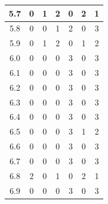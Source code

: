 \documentclass[11pt]{jreport}
\begin{document}
\begin{table}
{\begin{tabular}{c|c|c|c|c|c|c}
    \hline
    5.7 & 0 & 1 & 2 & 0 & 2 & 1 \\
    \hline
    5.8 & 0 & 0 & 1 & 2 & 0 & 3 \\
    \hline
    5.9 & 0 & 1 & 2 & 0 & 1 & 2 \\
    \hline
    6.0 & 0 & 0 & 0 & 3 & 0 & 3 \\
    \hline
    6.1 & 0 & 0 & 0 & 3 & 0 & 3 \\
    \hline
    6.2 & 0 & 0 & 0 & 3 & 0 & 3 \\
    \hline
    6.3 & 0 & 0 & 0 & 3 & 0 & 3 \\
    \hline
    6.4 & 0 & 0 & 0 & 3 & 0 & 3 \\
    \hline
    6.5 & 0 & 0 & 0 & 3 & 1 & 2 \\
    \hline
    6.6 & 0 & 0 & 0 & 3 & 0 & 3 \\
    \hline
    6.7 & 0 & 0 & 0 & 3 & 0 & 3 \\
    \hline
    6.8 & 2 & 0 & 1 & 0 & 2 & 1 \\
    \hline
    6.9 & 0 & 0 & 0 & 3 & 0 & 3 \\
    \hline
    \end{tabular}
    }
\end{table}          
\end{document}
